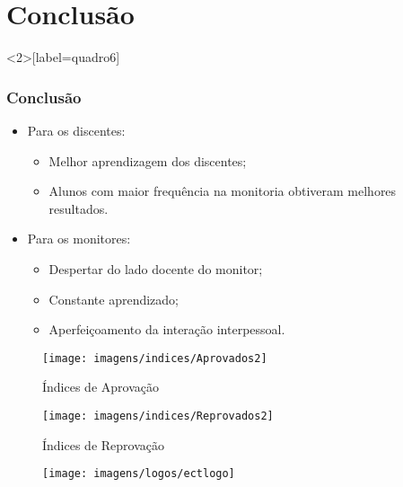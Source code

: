 \section{Conclusão}
    \begin{frame}<2>[label=quadro6]
    	\frametitle{Conclusão}
    
    	\begin{itemize}[<+- | alert@+>]
        	\item Para os discentes:
            	\begin{itemize}[<+- | alert@+>]
                    \item Melhor aprendizagem dos discentes;
                    \item Alunos com maior frequência na monitoria obtiveram melhores resultados.	
            	\end{itemize}
            \item Para os monitores:
				\begin{itemize}[<+- | alert@+>]
					\item Despertar do lado docente do monitor;
                    \item Constante aprendizado;
                    \item Aperfeiçoamento da interação interpessoal.
				\end{itemize}
    	\end{itemize}
    \end{frame}
    
    
     \begin{frame}
		\begin{figure}
              \centering
              \texttt{[image: imagens/indices/Aprovados2]}
              \caption{Índices de Aprovação}
              \label{ind-aprov}
         \end{figure} 
	\end{frame}	
    
     \begin{frame}
		\begin{figure}
              \centering
              \texttt{[image: imagens/indices/Reprovados2]}
              \caption{Índices de Reprovação}
              \label{ind-reprov}
         \end{figure} 
	\end{frame}	
       
       
       
       
     \begin{frame}
     
     \begin{figure}
              \centering
              \texttt{[image: imagens/logos/ectlogo]}
         \end{figure} 
     
     \end{frame}  
     